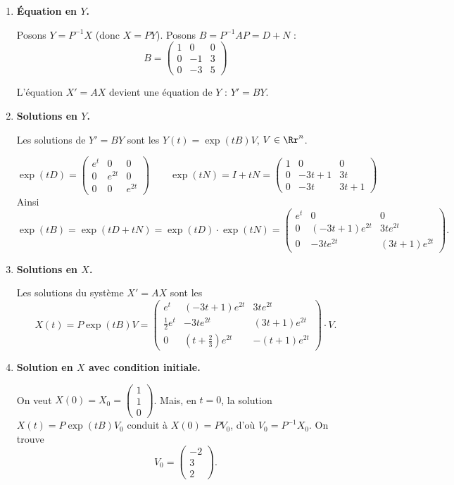 \documentclass[12pt, class=report,crop=false]{standalone}
\begin{document}
\begin{exemple}
\begin{enumerate}
  \item \textbf{\'Equation en $Y$.} 
  
  Posons $Y = P^{-1}X$ (donc $X=PY$). Posons $B = P^{-1}AP=D+N$ :
  $$B = \begin{pmatrix}
  1 & 0 & 0 \\
  0 & -1 & 3 \\
  0 & -3 & 5
  \end{pmatrix}$$
  
  L'équation $X'=AX$ devient une équation de $Y$ :
  $Y' = BY$.
  
  \item \textbf{Solutions en $Y$.}  
  
  Les solutions de $Y' = BY$ sont les $Y(t)=\exp(tB)V$, $V\in\Rr^n$.
  
  $$\exp(tD) = \begin{pmatrix}e^{t}&0&0\\0&e^{2t}&0\\0&0&e^{2t}\end{pmatrix}
  \qquad
  \exp(tN) = I + tN 
  = 
  \begin{pmatrix}
  1 & 0 & 0 \\
  0 & -3t + 1 & 3t \\
  0 & -3t & 3t + 1
  \end{pmatrix}
  $$
  Ainsi
  $$\exp(tB)=\exp(tD+tN)=\exp(tD)\cdot\exp(tN)=
  \begin{pmatrix}
  e^{t} & 0 & 0 \\
  0 & (-3t + 1)e^{2t} & 3te^{2t} \\
  0 & -3te^{2t} & (3t + 1)e^{2t}
  \end{pmatrix}.
  $$
   
  \item \textbf{Solutions en $X$.}
   
  Les solutions du système $X'=AX$ sont les
  $$X(t) = P\exp(tB)V = 
  \begin{pmatrix}
  e^t & (-3t + 1)e^{2t} & 3te^{2t} \\
  \frac12 e^t & -3te^{2t} & (3t + 1)e^{2t} \\
  0 & (t+\frac23)e^{2t} & -(t + 1)e^{2t}
  \end{pmatrix} \cdot V.$$
   
  \item \textbf{Solution en $X$ avec condition initiale.} 
  
  On veut $X(0) = X_0= \left(\begin{smallmatrix}1\\1\\0\end{smallmatrix}\right)$.
  Mais, en $t=0$, la solution $X(t) = P\exp(tB)V_0$ conduit à 
  $X(0) = PV_0$, d'où $V_0 = P^{-1}X_0$.
  On trouve 
  $$V_0 = \begin{pmatrix}-2\\3\\2\end{pmatrix}.$$  
  

\end{enumerate}
\end{exemple}
\end{document}
